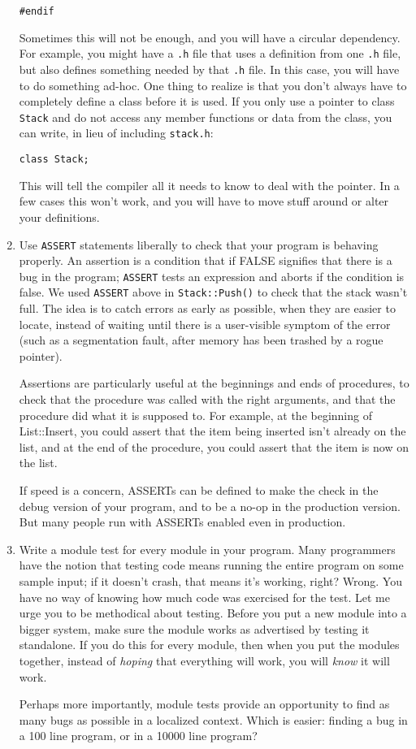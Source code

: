 \begin{enumerate}
\begin{verbatim}
#endif
\end{verbatim}
Sometimes this will not be enough, and you will have a circular
dependency.  For example, you might have a {\tt .h} file that
uses a definition from one {\tt .h} file, but also defines something
needed by that {\tt .h} file.  In this case, you will have to do
something ad-hoc.  One thing to realize is that you don't always
have to completely define a class before it is used.  If you
only use a pointer to class {\tt Stack} and do not access any
member functions or data from the class, you can write, in lieu of
including {\tt stack.h}:
\begin{verbatim}
class Stack;
\end{verbatim}
This will tell the compiler all it
needs to know to deal with the pointer.  In a few cases this won't work,
and you will have to move stuff around or alter your definitions.

\item Use {\tt ASSERT} statements liberally to check that your program
is behaving properly.  An assertion is a condition that if
FALSE signifies that there is a bug in the program;
{\tt ASSERT} tests an expression and aborts if the condition is
false.  We used {\tt ASSERT} above in {\tt Stack::Push()} to check
that the stack wasn't full. The idea is to catch errors as early
as possible, when they are easier to locate, instead of waiting until
there is a user-visible symptom of the error (such as a segmentation
fault, after memory has been trashed by a rogue pointer).

Assertions are particularly useful at the beginnings and ends of
procedures, to check that the procedure was called with the right
arguments, and that the procedure did what it is supposed to.
For example, at the beginning of List::Insert, you could assert that
the item being inserted isn't already on the list, and at the end of
the procedure, you could assert that the item is now on the list.

If speed is a concern, ASSERTs can be defined to make the check
in the debug version of your program, and to be a no-op in the production
version.  But many people run with ASSERTs enabled even in production.

\item Write a module test for every module in your program.
Many programmers have the notion that testing code means running
the entire program on some sample input; if it doesn't crash, that
means it's working, right?  Wrong.  You have no way of knowing
how much code was exercised for the test.  Let me urge you to
be methodical about testing.  Before you put a new module
into a bigger system, make sure the module works as advertised
by testing it standalone.  If you do this for every module,
then when you put the modules together, instead of {\em hoping}
that everything will work, you will {\em know} it will work.

Perhaps more importantly, module tests provide an opportunity
to find as many bugs as possible in a localized context.
Which is easier: finding a bug in a 100 line program, or in a
10000 line program?

\end{enumerate}

